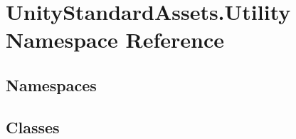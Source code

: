 \hypertarget{namespace_unity_standard_assets_1_1_utility}{}\section{Unity\+Standard\+Assets.\+Utility Namespace Reference}
\label{namespace_unity_standard_assets_1_1_utility}
\subsection*{Namespaces}
\begin{DoxyCompactItemize}
\end{DoxyCompactItemize}
\subsection*{Classes}
